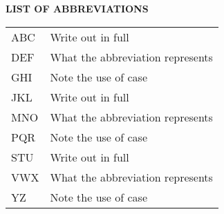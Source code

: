 
{
  \thispagestyle{empty}

  {\bfseries\Large LIST OF ABBREVIATIONS}

  \vspace*{1cm}

  \begin{tabular}{p{3cm}l}
    ABC      & Write out in full \\
    DEF      & What the abbreviation represents \\
    GHI      & Note the use of case \\
    JKL      & Write out in full \\
    MNO      & What the abbreviation represents \\
    PQR      & Note the use of case \\
    STU      & Write out in full \\
    VWX      & What the abbreviation represents \\
    YZ       & Note the use of case
  \end{tabular}

  \newpage
}

